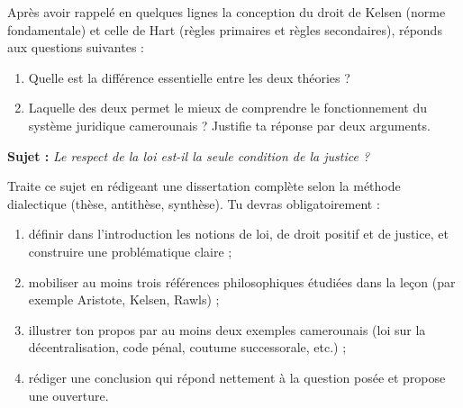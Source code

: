 \documentclass[11pt]{article}
\newcommand{\cle}[1]{{\popxbold\color{popdark}#1}}
\newcounter{popsec}
\newcounter{popsub}
\newcommand{\courssub}[1]{%
  \stepcounter{popsub}%
  \par\vspace{9pt}\noindent{\popxbold\fontsize{11.5}{13}\selectfont\color{popink}{\color{poporange}\thepopsec.\thepopsub}\hspace{6pt}#1}\par\nopagebreak\vspace{4pt}
}
\begin{document}
\begin{exercice}
Après avoir rappelé en quelques lignes la conception du droit de Kelsen (norme fondamentale) et celle de Hart (règles primaires et règles secondaires), réponds aux questions suivantes :
\begin{enumerate}
\item Quelle est la différence essentielle entre les deux théories ?
\item Laquelle des deux permet le mieux de comprendre le fonctionnement du système juridique camerounais ? Justifie ta réponse par deux arguments.
\end{enumerate}
\end{exercice}

\courssub{Je me prépare au Bac}

\begin{exercice}
\textbf{Sujet :} \emph{Le respect de la loi est-il la seule condition de la justice ?}

\medskip
Traite ce sujet en rédigeant une dissertation complète selon la méthode dialectique (thèse, antithèse, synthèse). Tu devras obligatoirement :
\begin{enumerate}
\item définir dans l'introduction les notions de \cle{loi}, de \cle{droit positif} et de \cle{justice}, et construire une problématique claire ;
\item mobiliser au moins trois références philosophiques étudiées dans la leçon (par exemple Aristote, Kelsen, Rawls) ;
\item illustrer ton propos par au moins deux exemples camerounais (loi sur la décentralisation, code pénal, coutume successorale, etc.) ;
\item rédiger une conclusion qui répond nettement à la question posée et propose une ouverture.
\end{enumerate}
\end{exercice}
\end{document}
